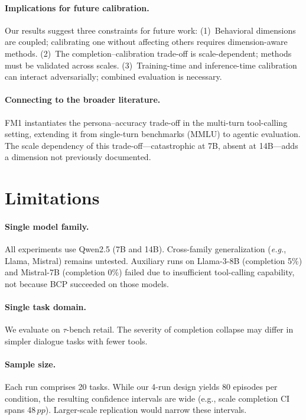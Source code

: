 \documentclass[11pt,a4paper]{article}
\newcommand{\taubench}{$\tau$-bench}
\newcommand{\pp}{\,pp}
\newcommand{\eg}{\textit{e.g.}}
\begin{document}
\paragraph{Implications for future calibration.}
Our results suggest three constraints for future work:
(1)~Behavioral dimensions are coupled; calibrating one without affecting others requires dimension-aware methods.
(2)~The completion--calibration trade-off is scale-dependent; methods must be validated across scales.
(3)~Training-time and inference-time calibration can interact adversarially; combined evaluation is necessary.

\paragraph{Connecting to the broader literature.}
FM1 instantiates the persona--accuracy trade-off \citep{basil2025playing_pretend, hu2026expert_persona} in the multi-turn tool-calling setting, extending it from single-turn benchmarks (MMLU) to agentic evaluation.
The scale dependency of this trade-off---catastrophic at 7B, absent at 14B---adds a dimension not previously documented.

\section{Limitations}
\label{sec:limitations}

\paragraph{Single model family.}
All experiments use Qwen2.5 (7B and 14B).
Cross-family generalization (\eg, Llama, Mistral) remains untested.
Auxiliary runs on Llama-3-8B (completion 5\%) and Mistral-7B (completion 0\%) failed due to insufficient tool-calling capability, not because BCP succeeded on those models.

\paragraph{Single task domain.}
We evaluate on \taubench{} retail.
The severity of completion collapse may differ in simpler dialogue tasks with fewer tools.

\paragraph{Sample size.}
Each run comprises 20 tasks.
While our 4-run design yields 80 episodes per condition, the resulting confidence intervals are wide (e.g., scale completion CI spans 48$\pp$).
Larger-scale replication would narrow these intervals.
\end{document}
